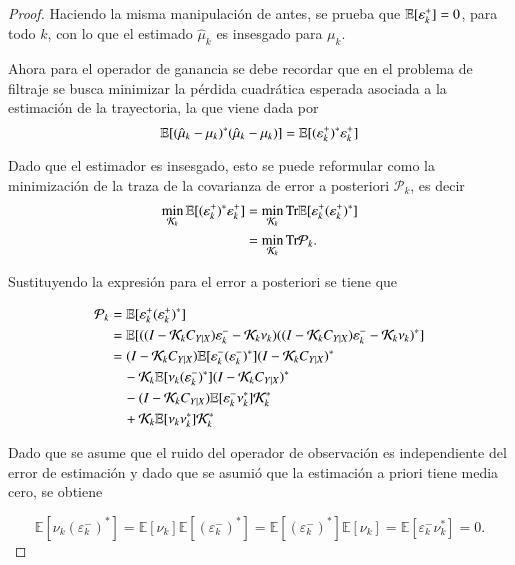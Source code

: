 \begin{proof}
Haciendo la misma manipulación de antes, se prueba que $\mathbb{E}[\varepsilon^+_k] = 0$, para todo $k$, con lo que el estimado $\hat{\mu}_k$ es insesgado para $\mu_k$.

Ahora para el operador de ganancia se debe recordar que en el problema de filtraje se busca minimizar la pérdida cuadrática esperada asociada a la estimación de la trayectoria, la que viene dada por
\begin{equation*}
    \mathbb{E}[(\hat{\mu}_{k} - \mu_{k})^* (\hat{\mu}_{k} - \mu_{k}) ] = \mathbb{E} [ (\varepsilon_k^+)^* \varepsilon_k^+ ]
\end{equation*}

Dado que el estimador es insesgado, esto se puede reformular como la minimización de la traza de la covarianza de error a posteriori $\mathcal{P}_k$, es decir
\begin{align*}
\min_{\mathcal{K}_k} \mathbb{E}[(\varepsilon_k^+)^* \varepsilon_k^+] &= \min_{\mathcal{K}_k} \text{Tr} \mathbb{E}[\varepsilon_k^+(\varepsilon_k^+)^*] \\
&= \min_{\mathcal{K}_k} \text{Tr} \mathcal{P}_{k}.
\end{align*}

Sustituyendo la expresión para el error a posteriori se tiene que

\begin{align*}
\mathcal{P}_k &= \mathbb{E}[\varepsilon^+_k(\varepsilon^+_k)^*] \\
&= \mathbb{E}[((I - \mathcal{K}_k C_{Y|X})\varepsilon^-_k - \mathcal{K}_k \nu_k)((I - \mathcal{K}_k C_{Y|X})\varepsilon^-_k - \mathcal{K}_k \nu_k)^*] \\
&= (I - \mathcal{K}_k C_{Y|X})\mathbb{E}[\varepsilon^-_k(\varepsilon^-_k)^*](I - \mathcal{K}_k C_{Y|X})^* \\
&\quad - \mathcal{K}_k\mathbb{E}[\nu_k(\varepsilon^-_k)^*](I - \mathcal{K}_k C_{Y|X})^* \\
&\quad - (I - \mathcal{K}_k C_{Y|X})\mathbb{E}[\varepsilon^-_k\nu_k^*]\mathcal{K}_k^* \\
&\quad + \mathcal{K}_k\mathbb{E}[\nu_k\nu_k^*]\mathcal{K}_k^*
\end{align*}

Dado que se asume que el ruido del operador de observación es independiente del error de estimación y dado que se asumió que la estimación a priori tiene media cero, se obtiene

\begin{equation*}
\mathbb{E}[\nu_k(\varepsilon^-_k)^*] = \mathbb{E}[\nu_k]\mathbb{E}[(\varepsilon^-_k)^*] = \mathbb{E}[(\varepsilon^-_k)^*]\mathbb{E}[\nu_k] = \mathbb{E}[\varepsilon^-_k\nu_k^*] = 0.
\end{equation*}


\end{proof}
